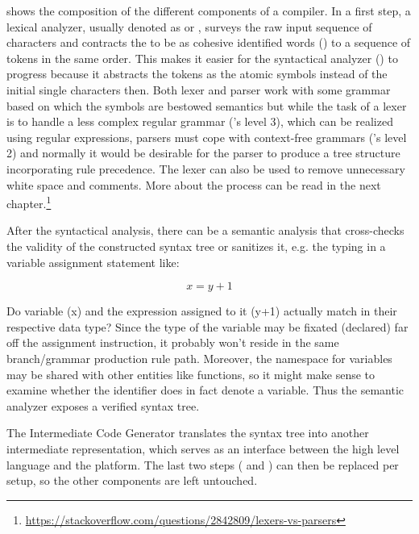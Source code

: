  shows the composition of the different components of a compiler. In a first step, a lexical analyzer, usually denoted as  or , surveys the raw input sequence of characters and contracts the to be as cohesive identified words () to a sequence of tokens in the same order. This makes it easier for the syntactical analyzer () to progress because it abstracts the tokens as the atomic symbols instead of the initial single characters then. Both lexer and parser work with some grammar based on which the symbols are bestowed semantics but while the task of a lexer is to handle a less complex regular grammar ('s level 3), which can be realized using regular expressions, parsers must cope with context-free grammars ('s level 2) and normally it would be desirable for the parser to produce a tree structure incorporating rule precedence. The lexer can also be used to remove unnecessary white space and comments. More about the process can be read in the next chapter.\footnote{\url{https://stackoverflow.com/questions/2842809/lexers-vs-parsers}}

After the syntactical analysis, there can be a semantic analysis that cross-checks the validity of the constructed syntax tree or sanitizes it, e.g. the typing in a variable assignment statement like:

\begin{equation}
	x=y+1
\end{equation}

Do variable (x) and the expression assigned to it (y+1) actually match in their respective data type? Since the type of the variable may be fixated (declared) far off the assignment instruction, it probably won't reside in the same branch/grammar production rule path. Moreover, the namespace for variables may be shared with other entities like functions, so it might make sense to examine whether the identifier does in fact denote a variable. Thus the semantic analyzer exposes a verified syntax tree.

The Intermediate Code Generator translates the syntax tree into another intermediate representation, which serves as an interface between the high level language and the platform. The last two steps ( and ) can then be replaced per setup, so the other components are left untouched.

